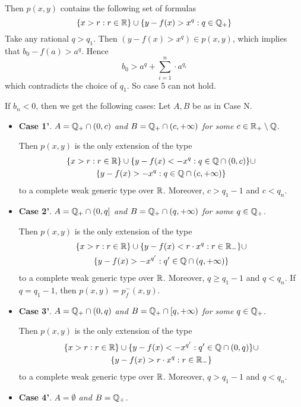 \documentclass[11pt]{article}
\begin{document}
\begin{itemize}
\begin{itemize}
Then \(p(x,y)\) contains the following set of formulas
\begin{equation*}
\{x>r:r\in\mathbb{R}\}\cup\{y-f(x)>x^q:q\in\mathbb{Q}_+\}
\end{equation*}
Take any rational \(q>q_1\). Then \((y-f(x)>x^q)\in p(x,y)\), which implies
that \(b_0-f(a)>a^q\). Hence
\begin{equation*}
b_0>a^q+\sum_{i=1}^n\cdot a^{q_i}
\end{equation*}
which contradicts the choice of \(q_1\). So case 5 can not hold.
\end{itemize}
If \(b_n<0\), then we get the following cases: Let \(A,B\) be as in Case N.
\begin{itemize}
\item \textbf{Case 1'}. \emph{\(A=\mathbb{Q}_+\cap(0,c)\) and \(B=\mathbb{Q}_+\cap(c,+\infty)\) for some \(c\in\mathbb{R}_+\setminus\mathbb{Q}\).}

Then \(p(x,y)\) is the only extension of the type
\begin{gather*}
\{x>r:r\in\mathbb{R}\}\cup\{y-f(x)<-x^q:q\in\mathbb{Q}\cap(0,c)\}\cup\\
\{y-f(x)>-x^q:q\in\mathbb{Q}\cap(c,+\infty)\}
\end{gather*}
to a complete weak generic type over \(\mathbb{R}\). Moreover, \(c>q_1-1\) and \(c<q_n\).
\item \textbf{Case 2'}. \emph{\(A=\mathbb{Q}_+\cap(0,q]\) and \(B=\mathbb{Q}_+\cap(q,+\infty)\) for some \(q\in\mathbb{Q}_+\).}

Then \(p(x,y)\) is the only extension of the type
\begin{gather*}
\{x>r:r\in\mathbb{R}\}\cup\{y-f(x)<r\cdot x^q:r\in\mathbb{R}_-\}\cup\\
\{y-f(x)>-x^{q'}:q'\in\mathbb{Q}\cap(q,+\infty)\}
\end{gather*}
to a complete weak generic type over \(\mathbb{R}\). Moreover, \(q\ge q_1-1\) and \(q<q_n\).
If \(q=q_1-1\), then \(p(x,y)=p_f^-(x,y)\).
\item \textbf{Case 3'}. \emph{\(A=\mathbb{Q}_+\cap(0,q)\) and \(B=\mathbb{Q}_+\cap[q,+\infty)\) for some \(q\in\mathbb{Q}_+\).}

Then \(p(x,y)\) is the only extension of the type
\begin{gather*}
\{x>r:r\in\mathbb{R}\}\cup\{y-f(x)<-x^{q'}:q'\in\mathbb{Q}\cap(0,q)\}\cup\\
\{y-f(x)>r\cdot x^q:r\in\mathbb{R}_-\}
\end{gather*}
to a complete weak generic type over \(\mathbb{R}\). Moreover, \(q>q_1-1\) and \(q<q_n\).
\item \textbf{Case 4'}. \emph{\(A=\emptyset\) and \(B=\mathbb{Q}_+\).}


\end{itemize}
\end{itemize}
\end{document}
